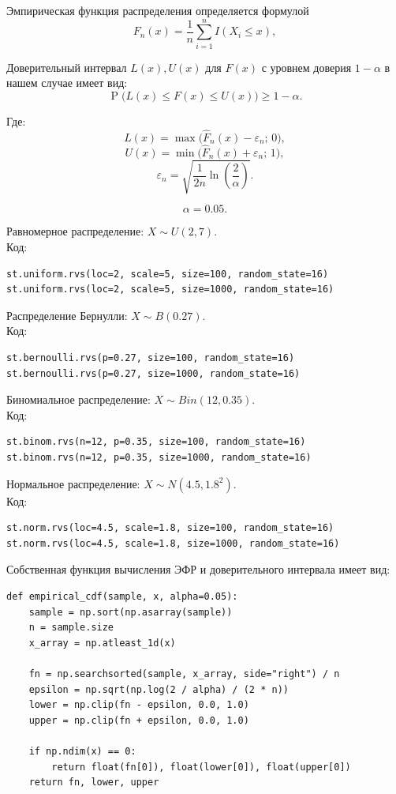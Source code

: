 \documentclass[a4paper,14pt]{extarticle}
\begin{document}
Эмпирическая функция распределения определяется формулой
\[
F_n(x)=\frac{1}{n}\sum_{i=1}^{n} I(X_i \le x),
\]


Доверительный интервал \(L(x), U(x)\) для \(F(x)\) с уровнем доверия \(1-\alpha\) в нашем случае имеет вид:
\[
\operatorname{P}\bigl(L(x)\le F(x)\le U(x)\bigr)\ge 1-\alpha.
\]

Где:
\[
L(x)=\max\bigl(\hat{F}_n(x)-\varepsilon_n;\,0\bigr),
\]
\[
U(x)=\min\bigl(\hat{F}_n(x)+\varepsilon_n;\,1\bigr),
\]
\[
\varepsilon_n=\sqrt{\frac{1}{2n}\ln\left(\frac{2}{\alpha}\right)}.
\]

\[
\alpha=0.05.
\]



Равномерное распределение: \(X \sim U(2,7)\).\\
Код:
\begin{lstlisting}
st.uniform.rvs(loc=2, scale=5, size=100, random_state=16)
st.uniform.rvs(loc=2, scale=5, size=1000, random_state=16)
\end{lstlisting}

Распределение Бернулли: \(X \sim B(0.27)\).\\
Код:
\begin{lstlisting}
st.bernoulli.rvs(p=0.27, size=100, random_state=16)
st.bernoulli.rvs(p=0.27, size=1000, random_state=16)
\end{lstlisting}

Биномиальное распределение: \(X \sim Bin(12,0.35)\).\\
Код:
\begin{lstlisting}
st.binom.rvs(n=12, p=0.35, size=100, random_state=16)
st.binom.rvs(n=12, p=0.35, size=1000, random_state=16)
\end{lstlisting}

Нормальное распределение: \(X \sim N(4.5, 1.8^2)\).\\
Код:
\begin{lstlisting}
st.norm.rvs(loc=4.5, scale=1.8, size=100, random_state=16)
st.norm.rvs(loc=4.5, scale=1.8, size=1000, random_state=16)
\end{lstlisting}

Собственная функция вычисления ЭФР и доверительного интервала имеет вид:

\begin{lstlisting}
def empirical_cdf(sample, x, alpha=0.05):
    sample = np.sort(np.asarray(sample))
    n = sample.size
    x_array = np.atleast_1d(x)

    fn = np.searchsorted(sample, x_array, side="right") / n
    epsilon = np.sqrt(np.log(2 / alpha) / (2 * n))
    lower = np.clip(fn - epsilon, 0.0, 1.0)
    upper = np.clip(fn + epsilon, 0.0, 1.0)

    if np.ndim(x) == 0:
        return float(fn[0]), float(lower[0]), float(upper[0])
    return fn, lower, upper
\end{lstlisting}
\end{document}

